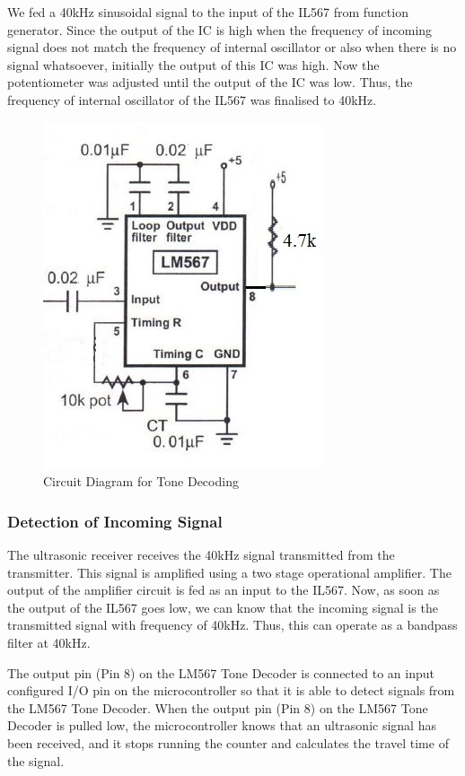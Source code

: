 We fed a 40kHz sinusoidal signal to the input of the IL567 from function generator. Since the output of the IC is high when the frequency of incoming signal does not match the frequency of internal oscillator or also when there is no signal whatsoever, initially the output of this IC was high. Now the potentiometer was adjusted until the output of the IC was low. Thus, the frequency of internal oscillator of the IL567 was finalised to 40kHz.
\begin{figure}[h]
	\centering
	\includegraphics[scale=0.7]{Images/ToneDecoder.jpg}
	\caption{Circuit Diagram for Tone Decoding}
	\label{fig:CircuitDiagramForToneDecoding}
\end{figure}

\subsubsection{Detection of Incoming Signal}
The ultrasonic receiver receives the 40kHz signal transmitted from the transmitter. This signal is amplified using a two stage operational amplifier. The output of the amplifier circuit is fed as an input to the IL567. Now, as soon as the output of the IL567 goes low, we can know that the incoming signal is the transmitted signal with frequency of 40kHz. Thus, this can operate as a bandpass filter at 40kHz.

The output pin (Pin 8) on the LM567 Tone Decoder is connected to an input configured I/O pin on the microcontroller so that it is able to detect signals from the LM567 Tone Decoder. When the output pin (Pin 8) on the LM567 Tone Decoder is pulled low, the microcontroller knows that an ultrasonic signal has been received, and it stops running the counter and calculates the travel time of the signal.

